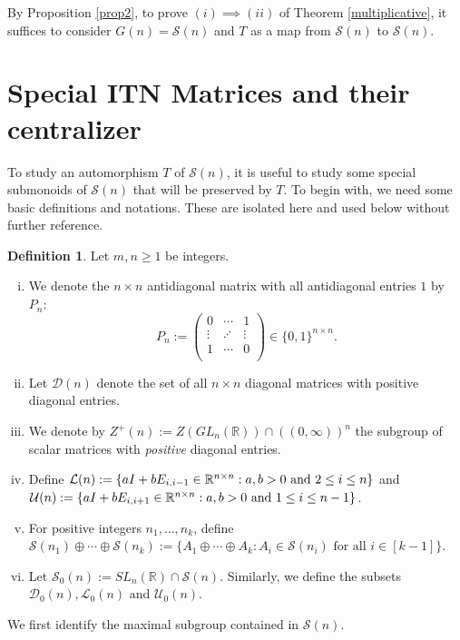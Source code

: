 \documentclass[11pt,reqno]{amsart}
\theoremstyle{plain}
\newtheorem{lemma}[theorem]{Lemma}
\theoremstyle{definition}
\newtheorem{defn}[theorem]{Definition}
\numberwithin{equation}{section}
\def\cS{\mathcal S}
\def\cD{\mathcal D}
\def\cU{\mathcal U}
\def\cL{\mathcal L}
\begin{document}
By Proposition \ref{prop2}, to prove $(i)\implies (ii)$ of Theorem \ref{multiplicative}, it suffices to consider $G(n)=\cS(n)$ and $T$ as a map from $\cS(n)$ to $\cS(n)$.

\section{Special ITN Matrices and their centralizer}
To study an automorphism $T$ of $\cS(n)$, it is useful to study some special submonoids of $\cS(n)$ that will be preserved by $T$. To begin with, we need some basic definitions and notations. These are isolated here and used below without further reference.
\begin{defn}
Let $m,n \geq 1$ be integers. %
\begin{enumerate}[(i)]
	\item We denote the $n\times n$ antidiagonal matrix with all antidiagonal entries $1$ by $P_n:$
	\[P_n:=\begin{pmatrix}
		0 & \cdots & 1 \\
		\vdots & \iddots & \vdots \\
		1 & \cdots & 0 \\
	\end{pmatrix} \in \{ 0, 1 \}^{n\times n}.\]
	\item Let $\cD(n)$  denote the set of all $n\times n$ diagonal matrices with positive diagonal entries.
	\item We denote by $Z^+(n) := Z(GL_n(\mathbb{R})) \cap ((0,\infty))^n$ the subgroup of scalar matrices with \textit{positive} diagonal entries.
	\item Define $\cL(n):=\{aI+bE_{i,{i-1}}\in \mathbb{R}^{n\times n}: a, b>0 \hbox{ and } 2\leq i\leq n\}$ %
	and $\cU(n):=\{aI+bE_{i,{i+1}}\in \mathbb{R}^{n\times n}: a, b>0 \hbox{ and } 1\leq i\leq n-1\}$.
	 \item For positive integers $n_1,\ldots,n_k$, define $\cS(n_1)\oplus\cdots\oplus \cS(n_k):=\{A_1\oplus\cdots \oplus A_k: A_i \in \cS(n_i) \text{ for all } i\in [k-1]\}$.
	 \item Let $\cS_0(n):=SL_n(\mathbb{R})\cap\cS(n)$. Similarly, we define the subsets $\cD_0(n), \cL_0(n)$ and $\cU_0(n)$.
\end{enumerate}
\end{defn}
We first identify the maximal subgroup contained in $\cS(n)$.
\end{document}
